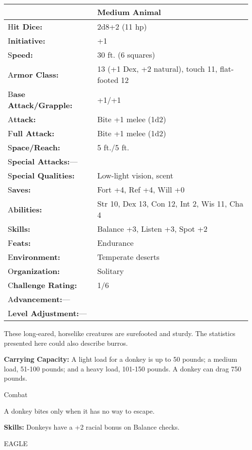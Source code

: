\documentclass{article}
\begin{document}
\begin{tabular}{|>{\raggedright}p{91pt}|>{\raggedright}p{193pt}|}
\hline
  & Medium Animal\tabularnewline
\hline
H\textbf{it Dice:} & 2d8+2 (11 hp)\tabularnewline
\hline
I\textbf{nitiative:} & +1\tabularnewline
\hline
S\textbf{peed:} & 30 ft. (6 squares)\tabularnewline
\hline
A\textbf{rmor Class:} & 13 (+1 Dex, +2 natural), touch 11, flat-footed 12\tabularnewline
\hline
B\textbf{ase Attack/Grapple:} & +1/+1\tabularnewline
\hline
A\textbf{ttack:} & Bite +1 melee (1d2)\tabularnewline
\hline
F\textbf{ull Attack:} & Bite +1 melee (1d2)\tabularnewline
\hline
S\textbf{pace/Reach:} & 5 ft./5 ft.\tabularnewline
\hline
S\textbf{pecial Attacks:}--- & \tabularnewline
\hline
S\textbf{pecial Qualities:} & Low-light vision, scent\tabularnewline
\hline
S\textbf{aves:} & Fort +4, Ref +4, Will +0\tabularnewline
\hline
A\textbf{bilities:} & Str 10, Dex 13, Con 12, Int 2, Wis 11, Cha 4\tabularnewline
\hline
S\textbf{kills:} & Balance +3, Listen +3, Spot +2\tabularnewline
\hline
F\textbf{eats:} & Endurance\tabularnewline
\hline
E\textbf{nvironment:} & Temperate deserts\tabularnewline
\hline
O\textbf{rganization:} & Solitary\tabularnewline
\hline
C\textbf{hallenge Rating:} & 1/6\tabularnewline
\hline
A\textbf{dvancement:}--- & \tabularnewline
\hline
L\textbf{evel Adjustment:}--- & \tabularnewline
\hline
\end{tabular}

These long-eared, horselike creatures are surefooted and sturdy. The statistics 
presented here could also describe burros.

\textbf{Carrying Capacity: }A light load for a donkey is up to 50 pounds; a medium 
load, 51-100 pounds; and a heavy load, 101-150 pounds. A donkey can drag 750 pounds.

Combat

A donkey bites only when it has no way to escape.

\textbf{Skills:} Donkeys have a +2 racial bonus on Balance checks.

\vspace{12pt}
EAGLE
\end{document}
